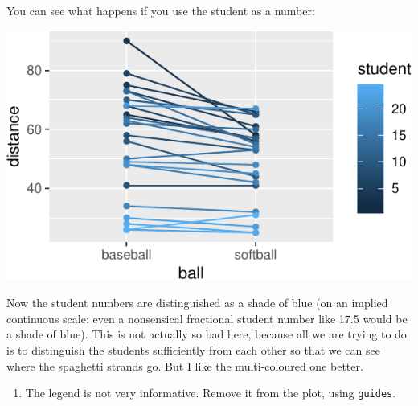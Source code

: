 \documentclass[]{tufte-book}
\newenvironment{Shaded}{}{}
\newcommand{\DataTypeTok}[1]{\textcolor[rgb]{0.56,0.13,0.00}{#1}}
\newcommand{\KeywordTok}[1]{\textcolor[rgb]{0.00,0.44,0.13}{\textbf{#1}}}
\newcommand{\NormalTok}[1]{#1}
\newcommand{\OperatorTok}[1]{\textcolor[rgb]{0.40,0.40,0.40}{#1}}
\newcommand{\StringTok}[1]{\textcolor[rgb]{0.25,0.44,0.63}{#1}}
\providecommand{\tightlist}{%
  \setlength{\itemsep}{0pt}\setlength{\parskip}{0pt}}
\theoremstyle{definition}
\theoremstyle{definition}
\theoremstyle{definition}
\theoremstyle{remark}
\begin{document}
You can see what happens if you use the student as a number:

\begin{Shaded}
\end{Shaded}

\includegraphics{11-tidying-and-selecting-data_files/figure-latex/unnamed-chunk-20-1}

Now the student numbers are distinguished as a shade of blue (on an
implied continuous scale: even a nonsensical fractional student number
like 17.5 would be a shade of blue). This is not actually so bad here,
because all we are trying to do is to distinguish the students
sufficiently from each other so that we can see where the spaghetti
strands go. But I like the multi-coloured one better.

\begin{enumerate}
\def\labelenumi{(\alph{enumi})}
\setcounter{enumi}{5}
\tightlist
\item
  The legend is not very informative. Remove it from the plot, using
  \texttt{guides}.
\end{enumerate}
\end{document}
